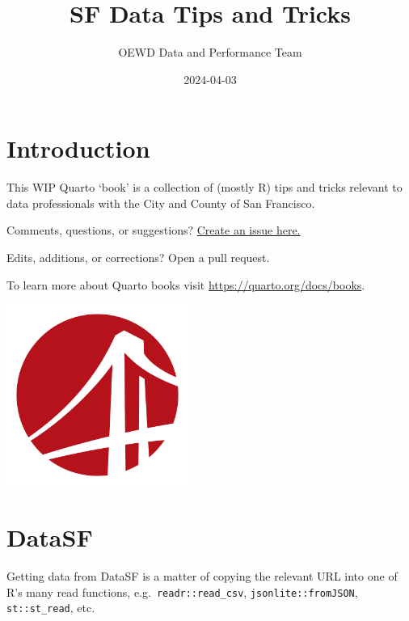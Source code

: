 \documentclass[
  letterpaper,
  DIV=11,
  numbers=noendperiod]{scrreprt}
\title{SF Data Tips and Tricks}
\author{OEWD Data and Performance Team}
\date{2024-04-03}
\renewcommand*\contentsname{Table of contents}
\newcommand\contentsname{Table of contents}
\begin{document}
\maketitle

\renewcommand*\contentsname{Table of contents}
{
\hypersetup{linkcolor=}
\setcounter{tocdepth}{2}
\tableofcontents
}


\chapter*{Introduction}\label{introduction}


This WIP Quarto `book' is a collection of (mostly R) tips and tricks
relevant to data professionals with the City and County of San
Francisco.

Comments, questions, or suggestions?
\href{https://github.com/SFOEWD/SF-Data-Tips-and-Tricks/issues}{Create
an issue here.}

Edits, additions, or corrections? Open a pull request.

To learn more about Quarto books visit
\url{https://quarto.org/docs/books}.

\begin{center}
\includegraphics[width=2.34375in,height=\textheight,keepaspectratio]{assets/OEWD Circle Logo.png}
\end{center}


\chapter{DataSF}\label{datasf}

Getting data from DataSF is a matter of copying the relevant URL into
one of R's many read functions, e.g.~\texttt{readr::read\_csv},
\texttt{jsonlite::fromJSON}, \texttt{st::st\_read}, etc.
\end{document}
